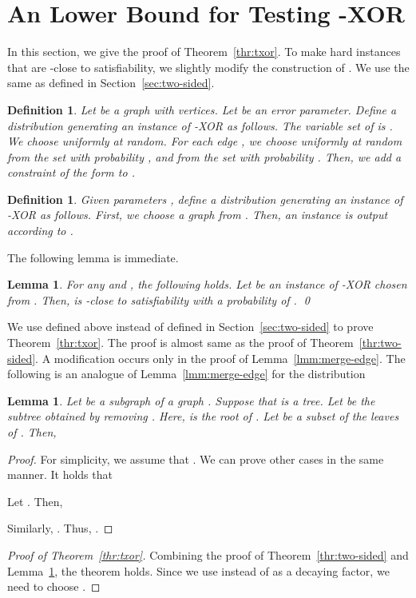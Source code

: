 \documentclass[letterpaper,11pt]{article}
\newtheorem{lemma}[theorem]{Lemma}
\newtheorem{definition}[theorem]{Definition}
\newcommand{\txor}{\textsf{-XOR}\xspace}
\begin{document}
\section{An  Lower Bound for Testing \txor}\label{apx:txor}
In this section, 
we give the proof of Theorem~\ref{thr:txor}.
To make hard instances that are -close to satisfiability,
we slightly modify the construction of .
We use the same  as defined in Section~\ref{sec:two-sided}.
\begin{definition}
  Let  be a graph with  vertices.
  Let  be an error parameter.
  Define a distribution  generating an instance  of \txor as follows.
  The variable set of  is .
  We choose  uniformly at random.
  For each edge , 
  we choose  uniformly at random from the set  with probability ,
  and from the set  with probability .
  Then, we add a constraint  of the form  to .
\end{definition}
\begin{definition}
  Given parameters , 
  define a distribution  generating an instance of \txor as follows.
  First, we choose a graph  from .
  Then, an instance is output according to .
\end{definition}
The following lemma is immediate.
\begin{lemma}\label{lmm:close}
  For any  and , the following holds.
  Let  be an instance of \txor chosen from .
  Then,  is -close to satisfiability with a probability of .
  \qed
\end{lemma}

We use  defined above instead of  defined in Section~\ref{sec:two-sided} to prove Theorem~\ref{thr:txor}.
The proof is almost same as the proof of Theorem~\ref{thr:two-sided}.
A modification occurs only in the proof of Lemma~\ref{lmm:merge-edge}.
The following is an analogue of Lemma~\ref{lmm:merge-edge} for the distribution 
\begin{lemma}\label{lmm:merge-edge-txor}
  Let  be a subgraph of a graph .
  Suppose that  is a tree.
  Let  be the subtree obtained by removing .
  Here,  is the root of .
  Let  be a subset of the leaves of .
  Then,
  
\end{lemma}
\begin{proof}
  For simplicity, 
  we assume that .
  We can prove other cases in the same manner.
  It holds that 
  
  Let .
  Then,
  
  Similarly, .
  Thus, 
  .
\end{proof}
\begin{proof}[Proof of Theorem~\ref{thr:txor}]
  Combining the proof of Theorem~\ref{thr:two-sided} and Lemma~\ref{lmm:merge-edge-txor}, 
  the theorem holds.
  Since we use  instead of  as a decaying factor,
  we need to choose .
\end{proof}
\end{document}
